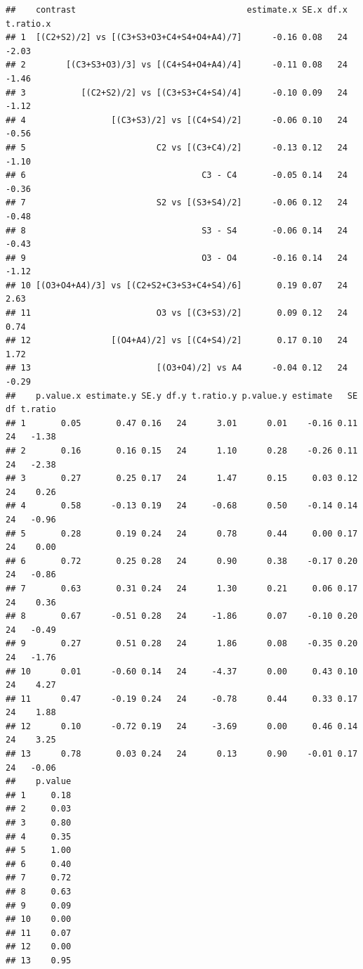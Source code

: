 \documentclass[
]{article}
\begin{document}
\begin{verbatim}
##    contrast                                  estimate.x SE.x df.x t.ratio.x
## 1  [(C2+S2)/2] vs [(C3+S3+O3+C4+S4+O4+A4)/7]      -0.16 0.08   24     -2.03
## 2        [(C3+S3+O3)/3] vs [(C4+S4+O4+A4)/4]      -0.11 0.08   24     -1.46
## 3           [(C2+S2)/2] vs [(C3+S3+C4+S4)/4]      -0.10 0.09   24     -1.12
## 4                 [(C3+S3)/2] vs [(C4+S4)/2]      -0.06 0.10   24     -0.56
## 5                          C2 vs [(C3+C4)/2]      -0.13 0.12   24     -1.10
## 6                                   C3 - C4       -0.05 0.14   24     -0.36
## 7                          S2 vs [(S3+S4)/2]      -0.06 0.12   24     -0.48
## 8                                   S3 - S4       -0.06 0.14   24     -0.43
## 9                                   O3 - O4       -0.16 0.14   24     -1.12
## 10 [(O3+O4+A4)/3] vs [(C2+S2+C3+S3+C4+S4)/6]       0.19 0.07   24      2.63
## 11                         O3 vs [(C3+S3)/2]       0.09 0.12   24      0.74
## 12                [(O4+A4)/2] vs [(C4+S4)/2]       0.17 0.10   24      1.72
## 13                         [(O3+O4)/2] vs A4      -0.04 0.12   24     -0.29
##    p.value.x estimate.y SE.y df.y t.ratio.y p.value.y estimate   SE df t.ratio
## 1       0.05       0.47 0.16   24      3.01      0.01    -0.16 0.11 24   -1.38
## 2       0.16       0.16 0.15   24      1.10      0.28    -0.26 0.11 24   -2.38
## 3       0.27       0.25 0.17   24      1.47      0.15     0.03 0.12 24    0.26
## 4       0.58      -0.13 0.19   24     -0.68      0.50    -0.14 0.14 24   -0.96
## 5       0.28       0.19 0.24   24      0.78      0.44     0.00 0.17 24    0.00
## 6       0.72       0.25 0.28   24      0.90      0.38    -0.17 0.20 24   -0.86
## 7       0.63       0.31 0.24   24      1.30      0.21     0.06 0.17 24    0.36
## 8       0.67      -0.51 0.28   24     -1.86      0.07    -0.10 0.20 24   -0.49
## 9       0.27       0.51 0.28   24      1.86      0.08    -0.35 0.20 24   -1.76
## 10      0.01      -0.60 0.14   24     -4.37      0.00     0.43 0.10 24    4.27
## 11      0.47      -0.19 0.24   24     -0.78      0.44     0.33 0.17 24    1.88
## 12      0.10      -0.72 0.19   24     -3.69      0.00     0.46 0.14 24    3.25
## 13      0.78       0.03 0.24   24      0.13      0.90    -0.01 0.17 24   -0.06
##    p.value
## 1     0.18
## 2     0.03
## 3     0.80
## 4     0.35
## 5     1.00
## 6     0.40
## 7     0.72
## 8     0.63
## 9     0.09
## 10    0.00
## 11    0.07
## 12    0.00
## 13    0.95
\end{verbatim}
\end{document}
